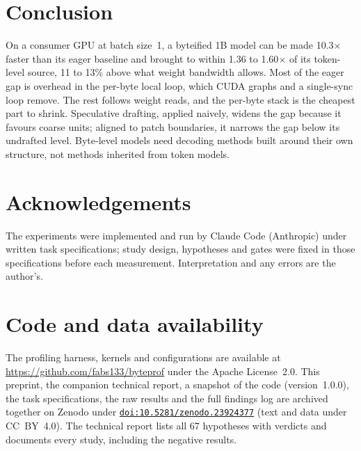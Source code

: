 \documentclass[11pt,a4paper]{article}
\newcommand{\x}{\ensuremath{\times}}
\begin{document}
\section{Conclusion}

On a consumer GPU at batch size~1, a byteified 1B model can be made 10.3\x{} faster than its eager baseline and brought to within 1.36 to 1.60\x{} of its token-level source, 11 to 13\% above what weight bandwidth allows. Most of the eager gap is overhead in the per-byte local loop, which CUDA graphs and a single-sync loop remove. The rest follows weight reads, and the per-byte stack is the cheapest part to shrink. Speculative drafting, applied naively, widens the gap because it favours coarse units; aligned to patch boundaries, it narrows the gap below its undrafted level. Byte-level models need decoding methods built around their own structure, not methods inherited from token models.

\section*{Acknowledgements}

The experiments were implemented and run by Claude Code (Anthropic) under written task specifications; study design, hypotheses and gates were fixed in those specifications before each measurement. Interpretation and any errors are the author's.

\section*{Code and data availability}

The profiling harness, kernels and configurations are available at \url{https://github.com/fabs133/byteprof} under the Apache License~2.0. This preprint, the companion technical report, a snapshot of the code (version~1.0.0), the task specifications, the raw results and the full findings log are archived together on Zenodo under \href{https://doi.org/10.5281/zenodo.23924377}{\texttt{doi:10.5281/zenodo.23924377}} (text and data under CC~BY~4.0). The technical report lists all 67 hypotheses with verdicts and documents every study, including the negative results.



\end{document}
